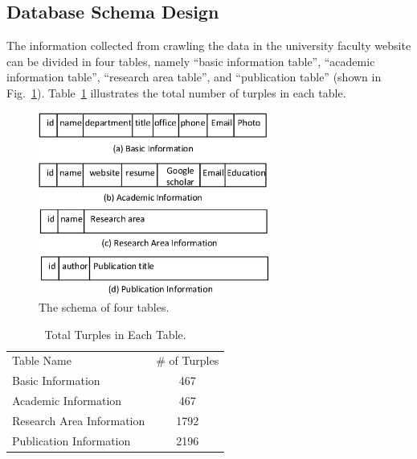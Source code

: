 \documentclass[authoryear,preprint,final,12pt]{elsarticle}
\begin{document}
\subsection{Database Schema Design}
The information collected from crawling the data in the university faculty website can be divided in four tables, namely ``basic information table'', ``academic information table'', ``research area table'', and ``publication table'' (shown in Fig.~\ref{tables}). Table~\ref{turple} illustrates the total number of turples in each table. %

\begin{figure}[H]
\centering
 \includegraphics[width=3in]{figures/schema.eps}
 \caption{The schema of four tables.}
 \label{tables}
\end{figure}

\begin{table}[ht]
\caption{Total Turples in Each Table.}
\label{turple}
\begin{center}
\begin{tabular}{|l|c|}
\hline
Table Name					  &\# of Turples \\\cline{1-2}
Basic Information	      	  &  467	\\\cline{1-2}
Academic Information	      &  467	\\\cline{1-2}
Research Area Information	  &  1792	\\\cline{1-2}
Publication Information	      &  2196	\\\cline{1-2}
\hline
\end{tabular}
\end{center}
\end{table} 
\end{document}
